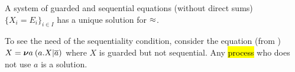 



\begin{theorem}
\label{t:Mil89}
A system of guarded and sequential equations (without direct sums)
$\{  X_i = E_i\}_{i\in I}$ has a unique solution for $\approx$.
\end{theorem}

To see the  need of the sequentiality  condition, consider
 the equation (from \cite{Mil89}) $X = {\boldsymbol \nu} a\: (a. X | \overline{a})$
where $X$ is guarded but not sequential. Any \hl{process} who does not use $a$ is a solution.
